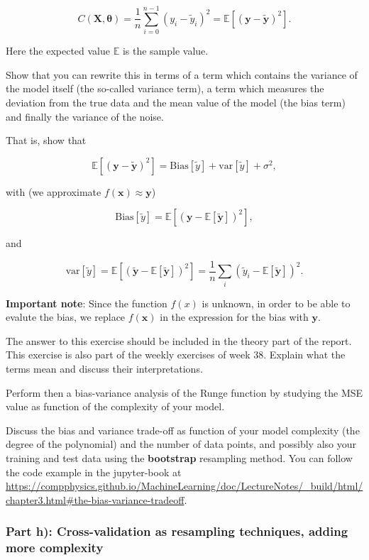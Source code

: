 \documentclass[11pt]{article}
\begin{document}
    \[
C(\boldsymbol{X},\boldsymbol{\theta}) =\frac{1}{n}\sum_{i=0}^{n-1}(y_i-\tilde{y}_i)^2=\mathbb{E}\left[(\boldsymbol{y}-\boldsymbol{\tilde{y}})^2\right].
\]

    Here the expected value \(\mathbb{E}\) is the sample value.

Show that you can rewrite this in terms of a term which contains the
variance of the model itself (the so-called variance term), a term which
measures the deviation from the true data and the mean value of the
model (the bias term) and finally the variance of the noise.

That is, show that

    \[
\mathbb{E}\left[(\boldsymbol{y}-\boldsymbol{\tilde{y}})^2\right]=\mathrm{Bias}[\tilde{y}]+\mathrm{var}[\tilde{y}]+\sigma^2,
\]

    with (we approximate \(f(\boldsymbol{x})\approx \boldsymbol{y}\))

    \[
\mathrm{Bias}[\tilde{y}]=\mathbb{E}\left[\left(\boldsymbol{y}-\mathbb{E}\left[\boldsymbol{\tilde{y}}\right]\right)^2\right],
\]

    and

    \[
\mathrm{var}[\tilde{y}]=\mathbb{E}\left[\left(\tilde{\boldsymbol{y}}-\mathbb{E}\left[\boldsymbol{\tilde{y}}\right]\right)^2\right]=\frac{1}{n}\sum_i(\tilde{y}_i-\mathbb{E}\left[\boldsymbol{\tilde{y}}\right])^2.
\]

    \textbf{Important note}: Since the function \(f(x)\) is unknown, in
order to be able to evalute the bias, we replace \(f(\boldsymbol{x})\)
in the expression for the bias with \(\boldsymbol{y}\).

The answer to this exercise should be included in the theory part of the
report. This exercise is also part of the weekly exercises of week 38.
Explain what the terms mean and discuss their interpretations.

Perform then a bias-variance analysis of the Runge function by studying
the MSE value as function of the complexity of your model.

Discuss the bias and variance trade-off as function of your model
complexity (the degree of the polynomial) and the number of data points,
and possibly also your training and test data using the
\textbf{bootstrap} resampling method. You can follow the code example in
the jupyter-book at
\url{https://compphysics.github.io/MachineLearning/doc/LectureNotes/_build/html/chapter3.html\#the-bias-variance-tradeoff}.

    \hypertarget{part-h-cross-validation-as-resampling-techniques-adding-more-complexity}{%
\subsubsection*{Part h): Cross-validation as resampling techniques,
adding more
complexity}\label{part-h-cross-validation-as-resampling-techniques-adding-more-complexity}}
\end{document}
